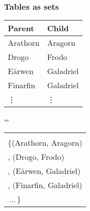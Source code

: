 \documentclass[xcolor=table]{beamer}
\begin{document}

\begin{frame}
  \frametitle{Tables as sets}


  \begin{minipage}{0.43\textwidth}
    \centering


    \begin{tabular}{l|l}
      \textbf{Parent} & \textbf{Child}\\\hline
      Arathorn & Aragorn\\
      Drogo & Frodo\\
      E\"arwen & Galadriel\\
      Finarfin & Galadriel\\
      \rowcolor{white}
      \hfill\vdots & \hfill\vdots
    \end{tabular}


  \end{minipage}
  \hfill{\LARGE =}\hfill
  \begin{minipage}{0.43\textwidth}
    \centering

    \begin{tabular}{l}
      \color{gray}{// set of (parent, child) pairs}\\
      \{\hspace{1pt}(Arathorn, Aragorn)\\
      , (Drogo, Frodo)\\
      , (E\"arwen, Galadriel)\\
      , (Finarfin, Galadriel)\\
      \,...\,\} \phantom{\vdots}
    \end{tabular}

  \end{minipage}

\end{frame}
\end{document}
